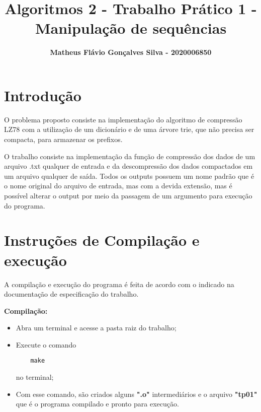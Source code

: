 \documentclass[12pt]{article}
\title{\textbf{Algoritmos 2 - Trabalho Prático 1 - Manipulação de sequências}}
\author{\textbf{Matheus Flávio Gonçalves Silva - 2020006850}}
\date{\parbox{\linewidth}{\centering%
    Universidade Federal de Minas Gerais (UFMG)\endgraf
    Belo Horizonte - MG - Brasil\endgraf\bigskip
    \href{mailto:matheusfgs@ufmg.br}{matheusfgs@ufmg.br}}}
\begin{document}
\maketitle

\section{Introdução}
\par O problema proposto consiste na implementação do algoritmo de compressão LZ78 com a utilização de
um dicionário e de uma árvore trie, que não precisa ser compacta, para armazenar os prefixos.

\par O trabalho consiste na implementação da função de compressão dos dados de um arquivo .txt
qualquer de entrada e da descompressão dos dados compactados em um arquivo qualquer de saída. Todos
os outputs possuem um nome padrão que é o nome original do arquivo de entrada, mas com a devida extensão,
mas é possível alterar o output por meio da passagem de um argumento para execução do programa.

\section{Instruções de Compilação e execução}
\par A compilação e execução do programa é feita de acordo com o indicado na documentação de especificação
do trabalho.

\par \textbf{Compilação:}

\begin{itemize}
	\item Abra um terminal e acesse a pasta raiz do trabalho;
	\item Execute o comando
	      \begin{verbatim}
	make
	\end{verbatim}
	      no terminal;
	\item Com esse comando, são criados alguns \textbf{".o"} intermediários e o arquivo
	      \textbf{"tp01"} que é o programa compilado e pronto para execução.
\end{itemize}
\end{document}
